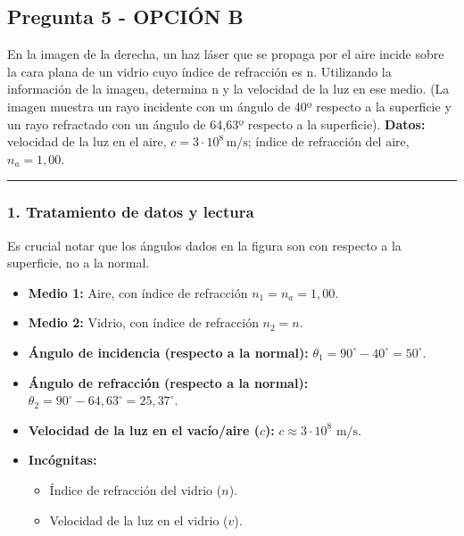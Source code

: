 \newpage

\subsection{Pregunta 5 - OPCIÓN B}
\label{subsec:5B_2025_jul_ord}

\begin{cajaenunciado}
En la imagen de la derecha, un haz láser que se propaga por el aire incide sobre la cara plana de un vidrio cuyo índice de refracción es n. Utilizando la información de la imagen, determina n y la velocidad de la luz en ese medio.
(La imagen muestra un rayo incidente con un ángulo de 40º respecto a la superficie y un rayo refractado con un ángulo de 64,63º respecto a la superficie).
\textbf{Datos:} velocidad de la luz en el aire, $c=3\cdot10^{8}\,\text{m/s}$; índice de refracción del aire, $n_a=1,00$.
\end{cajaenunciado}
\hrule

\subsubsection*{1. Tratamiento de datos y lectura}
Es crucial notar que los ángulos dados en la figura son con respecto a la superficie, no a la normal.
\begin{itemize}
    \item \textbf{Medio 1:} Aire, con índice de refracción $n_1 = n_a = 1,00$.
    \item \textbf{Medio 2:} Vidrio, con índice de refracción $n_2 = n$.
    \item \textbf{Ángulo de incidencia (respecto a la normal):} $\theta_1 = 90^\circ - 40^\circ = 50^\circ$.
    \item \textbf{Ángulo de refracción (respecto a la normal):} $\theta_2 = 90^\circ - 64,63^\circ = 25,37^\circ$.
    \item \textbf{Velocidad de la luz en el vacío/aire ($c$):} $c \approx 3 \cdot 10^8 \text{ m/s}$.
    \item \textbf{Incógnitas:}
    \begin{itemize}
        \item Índice de refracción del vidrio ($n$).
        \item Velocidad de la luz en el vidrio ($v$).
    \end{itemize}
\end{itemize}

